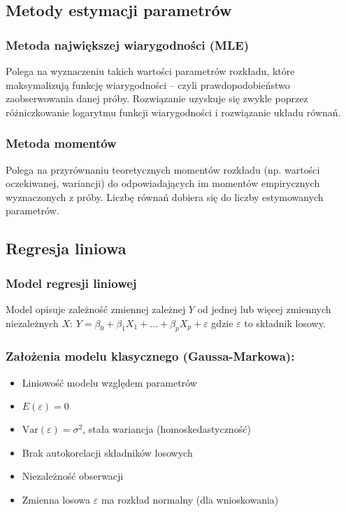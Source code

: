\subsection{Metody estymacji parametrów}
\subsubsection*{Metoda największej wiarygodności (MLE)}
Polega na wyznaczeniu takich wartości parametrów rozkładu, które maksymalizują funkcję wiarygodności -- czyli prawdopodobieństwo zaobserwowania danej próby. Rozwiązanie uzyskuje się zwykle poprzez różniczkowanie logarytmu funkcji wiarygodności i rozwiązanie układu równań.

\subsubsection*{Metoda momentów}
Polega na przyrównaniu teoretycznych momentów rozkładu (np. wartości oczekiwanej, wariancji) do odpowiadających im momentów empirycznych wyznaczonych z próby. Liczbę równań dobiera się do liczby estymowanych parametrów.

\subsection{Regresja liniowa}
\subsubsection*{Model regresji liniowej}
Model opisuje zależność zmiennej zależnej $Y$ od jednej lub więcej zmiennych niezależnych $X$:
$Y = \beta_0 + \beta_1 X_1 + \ldots + \beta_p X_p + \varepsilon$
gdzie $\varepsilon$ to składnik losowy.

\subsubsection*{Założenia modelu klasycznego (Gaussa-Markowa):}

\begin{itemize}
    \item Liniowość modelu względem parametrów
    \item $E(\varepsilon) = 0$
    \item $\text{Var}(\varepsilon) = \sigma^2$, stała wariancja (homoskedastyczność)
    \item Brak autokorelacji składników losowych
    \item Niezależność obserwacji
    \item Zmienna losowa $\varepsilon$ ma rozkład normalny (dla wnioskowania)
\end{itemize}

